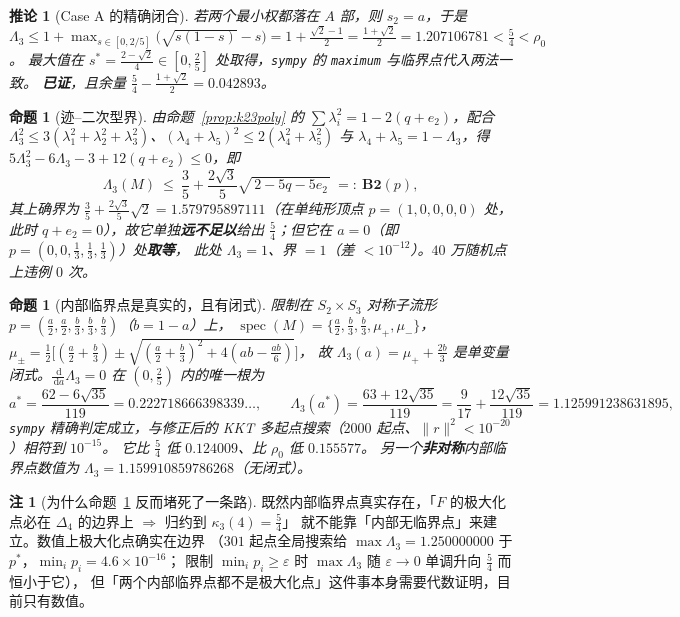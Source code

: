 \documentclass[UTF8,11pt]{ctexart}
\newtheorem{proposition}[theorem]{命题}
\newtheorem{corollary}[theorem]{推论}
\theoremstyle{definition}
\newtheorem{remark}[theorem]{注}
\newcommand{\Lam}{\Lambda}
\newcommand{\dd}{\,\mathrm{d}}
\begin{document}
\begin{corollary}[Case A 的精确闭合]\label{cor:k23caseA}
若两个最小权都落在 $A$ 部，则 $s_2=a$，于是
$\Lam_3\le1+\max_{s\in[0,2/5]}\bigl(\sqrt{s(1-s)}-s\bigr)=1+\frac{\sqrt2-1}{2}=\frac{1+\sqrt2}{2}=1.207106781<\frac54<\rho_0$。
最大值在 $s^\ast=\frac{2-\sqrt2}4\in[0,\frac25]$ 处取得，\texttt{sympy} 的 \texttt{maximum} 与临界点代入两法一致。
\textbf{已证}，且余量 $\frac54-\frac{1+\sqrt2}2=0.042893$。
\end{corollary}

\begin{proposition}[迹--二次型界]\label{prop:k23trQ}
由命题~\ref{prop:k23poly} 的 $\sum\lambda_i^2=1-2(q+e_2)$，配合
$\Lam_3^2\le3(\lambda_1^2+\lambda_2^2+\lambda_3^2)$、$(\lambda_4+\lambda_5)^2\le2(\lambda_4^2+\lambda_5^2)$
与 $\lambda_4+\lambda_5=1-\Lam_3$，得 $5\Lam_3^2-6\Lam_3-3+12(q+e_2)\le0$，即
\begin{equation}\label{eq:trQ}
\Lam_3(M)\ \le\ \frac35+\frac{2\sqrt3}{5}\sqrt{\,2-5q-5e_2\,}\ =:\ \mathbf{B2}(p),
\end{equation}
其上确界为 $\frac35+\frac{2\sqrt3}{5}\sqrt2=1.579795897111$（在单纯形顶点 $p=(1,0,0,0,0)$ 处，此时 $q+e_2=0$），故它单独\textbf{远不足以}给出 $\frac54$；但它在 $a=0$（即 $p=(0,0,\frac13,\frac13,\frac13)$）处\textbf{取等}，
此处 $\Lam_3=1$、界 $=1$（差 $<10^{-12}$）。$40$ 万随机点上违例 $0$ 次。
\end{proposition}

\begin{proposition}[内部临界点是真实的，且有闭式]\label{prop:k23cp}
限制在 $S_2\times S_3$ 对称子流形 $p=(\frac a2,\frac a2,\frac b3,\frac b3,\frac b3)$（$b=1-a$）上，
$\operatorname{spec}(M)=\{\frac a2,\frac b3,\frac b3,\mu_+,\mu_-\}$，
$\mu_\pm=\frac12\bigl[(\frac a2+\frac b3)\pm\sqrt{(\frac a2+\frac b3)^2+4(ab-\frac{ab}6)}\bigr]$，
故 $\Lam_3(a)=\mu_++\frac{2b}3$ 是单变量闭式。$\frac{\dd}{\dd a}\Lam_3=0$ 在 $(0,\frac25)$ 内的唯一根为
\[
a^\ast=\frac{62-6\sqrt{35}}{119}=0.222718666398339\ldots,\qquad
\Lam_3(a^\ast)=\frac{63+12\sqrt{35}}{119}=\frac9{17}+\frac{12\sqrt{35}}{119}=1.125991238631895,
\]
\texttt{sympy} 精确判定成立，与修正后的 KKT 多起点搜索（$2000$ 起点、$\|r\|^2<10^{-20}$）相符到 $10^{-15}$。
它比 $\frac54$ 低 $0.124009$、比 $\rho_0$ 低 $0.155577$。
另一个\textbf{非对称}内部临界点数值为 $\Lam_3=1.159910859786268$（无闭式）。
\end{proposition}

\begin{remark}[为什么命题~\ref{prop:k23cp} 反而堵死了一条路]\label{rmk:cpdead}
既然内部临界点真实存在，「$F$ 的极大化点必在 $\Delta_4$ 的边界上 $\Rightarrow$ 归约到 $\kappa_3(4)=\frac54$」
就不能靠「内部无临界点」来建立。数值上极大化点确实在边界
（$301$ 起点全局搜索给 $\max\Lam_3=1.250000000$ 于 $p^\ast$，$\min_ip_i=4.6\times10^{-16}$；
限制 $\min_ip_i\ge\varepsilon$ 时 $\max\Lam_3$ 随 $\varepsilon\to0$ 单调升向 $\frac54$ 而恒小于它），
但「两个内部临界点都不是极大化点」这件事本身需要代数证明，目前只有数值。
\end{remark}
\end{document}
